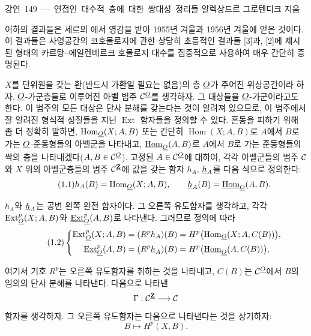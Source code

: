 \unit{강연 149 — 연접인 대수적 층에 대한 쌍대성 정리들}
%
  {알렉상드르 그로텐디크 지음}

이하의 결과들은 세르의 에서 영감을 받아
1955년 겨울과 1956년 겨울에 얻은 것이다. 이 결과들은 사영공간의
코호몰로지에 관한 상당히 초등적인 결과들 [3]과,
[2]에 제시된 형태의 카르탕--에일렌베르크 호몰로지 대수를 집중적으로
사용하여 매우 간단히 증명된다.


$X$를 단위원을 갖는 환(반드시 가환일 필요는 없음)의 층 $\underline{O}$가 주어진
위상공간이라 하자. $\underline{O}$-가군층들로 이루어진 아벨 범주
$\mathcal C^{\underline{O}}$를 생각하자. 그 대상들을 $\underline{O}$-가군이라고도 한다.
이 범주의 모든 대상은 단사 분해를 갖는다는 것이 알려져 있으므로, 이 범주에서
잘 알려진 형식적 성질들을 지닌 $\operatorname{Ext}$ 함자들을 정의할 수
있다. 혼동을 피하기 위해 좀 더 정확히 말하면,
$\operatorname{Hom}_{\underline{O}}(X;A,B)$ 또는 간단히
$\operatorname{Hom}(X;A,B)$로 $A$에서 $B$로 가는 $\underline{O}$-준동형들의 아벨군을
나타내고, $\underline{\operatorname{Hom}}_{\underline{O}}(A,B)$로 $A$에서 $B$로 가는 준동형들의
싹의 층을 나타내겠다($A,B\in\mathcal C^{\underline{O}}$). 고정된
$A\in\mathcal C^{\underline{O}}$에 대하여, 각각 아벨군들의 범주
$\mathcal C$와 $X$ 위의 아벨군층들의 범주
$\mathcal C^{\underline{\mathbf Z}}$에 값을 갖는 함자 $h_A$, $\underline{h}_A$를 다음 식으로 정의한다:
\begin{equation}\tag{1.1}
  h_A(B)=\operatorname{Hom}_{\underline{O}}(X;A,B),
  \qquad
  \underline{h}_A(B)=\underline{\operatorname{Hom}}_{\underline{O}}(A,B).
\end{equation}

$h_A$와 $\underline{h}_A$는 공변 왼쪽 완전 함자이다.
그 오른쪽 유도함자를 생각하고, 각각
$\operatorname{Ext}_{\underline{O}}^{p}(X;A,B)$와 $\underline{\operatorname{Ext}}_{\underline{O}}^{p}(A,B)$로 나타낸다. 그러므로
정의에 따라
\begin{equation}\tag{1.2}
\left\{
\begin{aligned}
\operatorname{Ext}_{\underline{O}}^{p}(X;A,B)
  &= (R^{p}h_A)(B)
   = H^{p}\bigl(\operatorname{Hom}_{\underline{O}}(X;A,C(B))\bigr),\\
\underline{\operatorname{Ext}}_{\underline{O}}^{p}(A,B)
  &= (R^{p}\underline{h}_A)(B)
   = H^{p}\bigl(\underline{\operatorname{Hom}}_{\underline{O}}(A,C(B))\bigr),
\end{aligned}
\right.
\end{equation}

여기서 기호 $R^{p}$는 오른쪽 유도함자를 취하는 것을 나타내고,
$C(B)$는 $\mathcal C^{\underline{O}}$에서 $B$의 임의의 단사 분해를 나타낸다.
다음으로 나타낸
\[
  \Gamma:\mathcal C^{\underline{\mathbf Z}}\longrightarrow\mathcal C
\]
 함자를 생각하자. 그 오른쪽 유도함자는 다음으로
나타낸다는 것을 상기하자:
\[
  B\longmapsto H^{p}(X,B).
\]


